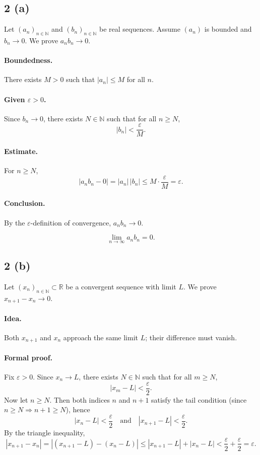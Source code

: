 \documentclass[12pt,a4paper]{article}
\theoremstyle{definition}
\theoremstyle{remark}
\begin{document}
\subsection*{2 (a)}
Let \((a_n)_{n\in\mathbb{N}}\) and \((b_n)_{n\in\mathbb{N}}\) be real sequences. Assume \((a_n)\) is bounded and \(b_n \to 0\). We prove \(a_n b_n \to 0\).

\paragraph{Boundedness.}
There exists \(M>0\) such that \(|a_n| \le M\) for all \(n\).

\paragraph{Given \(\varepsilon>0\).}
Since \(b_n \to 0\), there exists \(N\in\mathbb{N}\) such that for all \(n\ge N\),
\[
|b_n| < \frac{\varepsilon}{M}.
\]

\paragraph{Estimate.}
For \(n\ge N\),
\[
|a_n b_n - 0| = |a_n|\,|b_n| \le M \cdot \frac{\varepsilon}{M} = \varepsilon.
\]

\paragraph{Conclusion.}
By the \(\varepsilon\)-definition of convergence, \(a_n b_n \to 0\).

\[
\boxed{\lim_{n\to\infty} a_n b_n = 0.}
\]

\subsection*{2 (b)}
Let \((x_n)_{n\in\mathbb{N}}\subset \mathbb{R}\) be a convergent sequence with limit \(L\). We prove \(x_{n+1} - x_n \to 0\).

\paragraph{Idea.}
Both \(x_{n+1}\) and \(x_n\) approach the same limit \(L\); their difference must vanish.

\paragraph{Formal proof.}
Fix \(\varepsilon>0\). Since \(x_n \to L\), there exists \(N\in\mathbb{N}\) such that for all \(m\ge N\),
\[
 |x_m - L| < \frac{\varepsilon}{2}.
\]
Now let \(n\ge N\). Then both indices \(n\) and \(n+1\) satisfy the tail condition (since \(n\ge N\Rightarrow n+1\ge N\)), hence
\[
 |x_n - L| < \frac{\varepsilon}{2}
 \quad\text{and}\quad
 |x_{n+1} - L| < \frac{\varepsilon}{2}.
\]
By the triangle inequality,
\[
 |x_{n+1} - x_n|
 = |(x_{n+1}-L) - (x_n - L)|
 \le |x_{n+1} - L| + |x_n - L|
 < \frac{\varepsilon}{2} + \frac{\varepsilon}{2} = \varepsilon.
\]
\end{document}

